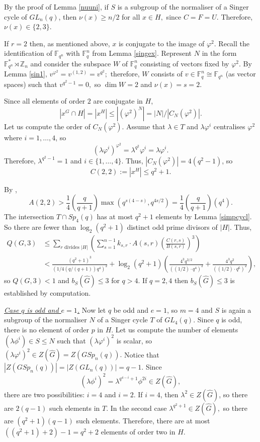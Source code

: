   By the proof of Lemma \ref{nuuni}, if $S$ is a subgroup of the normaliser of a Singer cycle of $GL_n(q)$, then $\nu(x) \ge n/2$ for all $x \in H,$ since $C=F=U.$ Therefore, $\nu(x) \in \{2,3\}$.


 If $r=2$ then, as  mentioned above, $x$ is conjugate to the image of $\varphi^2.$ Recall the identification of $\mathbb{F}_{q^n}$ with $\mathbb{F}_q^n$ from Lemma \ref{singex}. Represent $N$ in the form $\mathbb{F}_{q^n}^{*} \rtimes \mathbb{Z}_n$ and consider the subspace $W$ of $\mathbb{F}_q^n$ consisting of vectors fixed by $\varphi^2$. By Lemma \ref{sin1}, $v^{\varphi^2}=v^{(1,2)}=v^{q^2};$ therefore, $W$ consists of  $v\in \mathbb{F}_q^n \cong \mathbb{F}_{q^n}$ (as vector spaces) such that
$v^{q^2-1}=0,$  so $\dim W=2$ and  $\nu(x)=s=2$. 

Since all elements of order $2$ are conjugate in $H$, $$|x^G \cap H|=|x^H|\le|(\varphi^2)^N|= |N|/ |C_N(\varphi^2)|.$$ Let us compute the order of $C_N(\varphi^2).$ Assume that $\lambda \in T$  and $ \lambda \varphi^i$ centralises $\varphi^2$ where $i=1, \ldots, 4$, so
$$(\lambda \varphi^i)^{\varphi^2}= \lambda^{q^2}\varphi^i=\lambda \varphi^i.$$
Therefore, $\lambda^{q^2-1}=1$ and $i \in \{1, \ldots, 4\}$. Thus,   $|C_N(\varphi^2)|=4(q^2-1)$, so $$C(2,2):=|x^H|\le q^2+1.$$

 By \cite[Proposition 3.22]{fpr2}, 
$$A(2,2)>\frac{1}{4}\left(\frac{q}{q+1} \right) \max(q^{s(4-s)},q^{4s/2})=\frac{1}{4}\left(\frac{q}{q+1} \right)(q^{4}).$$ 
The intersection $T \cap Sp_4(q)$ has at most $q^2+1$ elements by Lemma \ref{simpcycl}. So there are fewer than $\log_2(q^2+1)$ distinct odd prime divisors of $|H|$. Thus,
\begin{equation*}
\begin{aligned}
Q(G,3)  & \le \sum_{r \text{ divides } |H|} \left(
\sum_{s=1}^{n-1} k_{s,r} \cdot A(s,r) \left(\frac{C(r,s)}{B(s,r)}  \right)^3 \right)\\  
  & <  \frac{(q^2+1)^3}{(1/4(q/(q+1))q^4)^2}  
+\log_2 \left( q^2+1 \right) \left(\frac{4^3 q^{3/2}}{((1/2) \cdot q^4)^2}  + \frac{4^3q^2}{((1/2) \cdot q^{6})^2}  \right),
\end{aligned}
\end{equation*}
so $Q(G,3)<1$ and $b_S(\hat{G})\le 3$ for  $q > 4.$ If $q=2, 4$ then $b_S(\hat{G})\le 3$ is established by computation. 

\medskip

\underline{\it Case ${q}$ is odd and ${e=1}$.} Now let $q$ be odd and $e=1$, so $m=4$ and $S$ is again a subgroup of the normaliser $N$ of a Singer cycle $T$ of $GL_4(q)$. Since $q$ is odd, there is no element of order $p$ in $H$. Let us compute the number of elements $(\lambda \phi^i) \in S\le N$ such that $(\lambda \varphi^i)^2$ is scalar, so $(\lambda \varphi^i)^2 \in Z(\hat{G})= Z(GSp_n(q)).$ Notice that $|Z(GSp_n(q))|=|Z(GL_n(q))|=q-1.$ Since $$(\lambda \phi^i)^2=\lambda^{q^{4-i}+1}\phi^{2i} \in Z(\hat{G}),$$
 there are two possibilities: $i=4$ and $i=2$. If $i=4$, then $\lambda^2 \in Z(\hat{G})$, so there are $2(q-1)$ such elements in $T$. 
In the second case $\lambda^{q^2+1} \in Z(\hat{G}),$ so there are $(q^2+1)(q-1)$ such elements. Therefore, there are at most $((q^2+1)+2)-1=q^2+2$ elements of order two in $H$.


